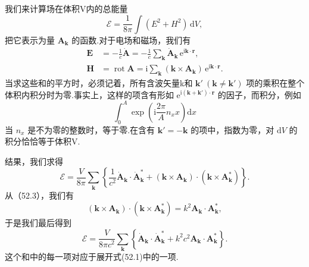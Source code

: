 我们来计算场在体积V内的总能量
\begin{equation*}
  \mathcal{E}=\frac{1}{8\pi}\int(E^2+H^2)\,\mathrm{d}V,
\end{equation*}
把它表示为量 $\boldsymbol{A}_{\boldsymbol{k}}$ 的函数.对于电场和磁场，我们有
\begin{equation}
\begin{aligned}
  \boldsymbol{E}&=-\frac{1}{c}\dot{\boldsymbol{A}}
  =-\frac{1}{c}\sum_{\boldsymbol{k}}\dot{\boldsymbol{A}}_{\boldsymbol{k}}\,
  \mathrm{e}^{\mathrm{i}\boldsymbol{k}\cdot\boldsymbol{r}},\\
  \boldsymbol{H}&=\operatorname{rot}\boldsymbol{A}
  =\mathrm{i}\sum_{\boldsymbol{k}}(\boldsymbol{k}\times\boldsymbol{A}_{\boldsymbol{k}})\,
  \mathrm{e}^{\mathrm{i}\boldsymbol{k}\cdot\boldsymbol{r}}.
\end{aligned}
\end{equation}
当求这些和的平方时，必须记着，所有含波矢量k和 $\boldsymbol{k}'\ (\boldsymbol{k}\neq\boldsymbol{k}')$ 项的乘积在整个体积内积分时为零.事实上，这样的项含有形如
$\mathrm{e}^{\mathrm{i}(\boldsymbol{k}+\boldsymbol{k}')\cdot\boldsymbol{r}}$ 的因子，而积分，例如
\begin{equation*}
  \int_0^A\exp\left(\mathrm{i}\frac{2\pi}{A}n_xx\right)\mathrm{d}x
\end{equation*}
当 $n_x$ 是不为零的整数时，等于零.在含有 $\boldsymbol{k}' = -\boldsymbol{k}$ 的项中，指数为零，对 $\mathrm{d}V$ 的积分恰恰等于体积V.

结果，我们求得
\begin{equation*}
  \mathcal{E}=\frac{V}{8\pi}\sum_{\boldsymbol{k}}
  \left\{\frac{1}{c^2}\dot{\boldsymbol{A}}_{\boldsymbol{k}}\cdot
  \dot{\boldsymbol{A}}_{\boldsymbol{k}}^*
  +(\boldsymbol{k}\times\boldsymbol{A}_{\boldsymbol{k}})\cdot
  (\boldsymbol{k}\times\boldsymbol{A}_{\boldsymbol{k}}^*)\right\}.
\end{equation*}
从（52.3），我们有
\begin{equation*}
  (\boldsymbol{k}\times\boldsymbol{A}_{\boldsymbol{k}})\cdot
  (\boldsymbol{k}\times\boldsymbol{A}_{\boldsymbol{k}}^*)
  =k^2\boldsymbol{A}_{\boldsymbol{k}}\cdot\boldsymbol{A}_{\boldsymbol{k}}^*,
\end{equation*}
于是我们最后得到
\begin{equation}
  \mathcal{E}=\frac{V}{8\pi c^2}\sum_{\boldsymbol{k}}
  \left\{\dot{\boldsymbol{A}}_{\boldsymbol{k}}\cdot\dot{\boldsymbol{A}}_{\boldsymbol{k}}^*
  +k^2c^2\boldsymbol{A}_{\boldsymbol{k}}\cdot\boldsymbol{A}_{\boldsymbol{k}}^*\right\}.
\end{equation}
这个和中的每一项对应于展开式(52.1)中的一项.

